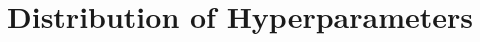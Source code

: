 \documentclass[10pt,oneside]{report}
\begin{document}
 

\section{Distribution of Hyperparameters}\label{sec:dist-hyp}


\end{document}
